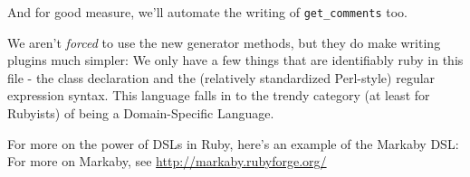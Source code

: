 \documentclass[12pt]{article}
\begin{document}
	And for good measure, we'll automate the writing of \verb|get_comments| too.
	
	
	We aren't \emph{forced} to use the new generator methods, but they do make writing plugins much simpler:
	We only have a few things that are identifiably ruby in this file - the class declaration and the (relatively standardized Perl-style) regular expression syntax.  This language falls in to the trendy category (at least for Rubyists) of being a Domain-Specific Language.
	
	For more on the power of DSLs in Ruby, here's an example of the Markaby DSL:
	For more on Markaby, see \url{http://markaby.rubyforge.org/}
\end{document}
